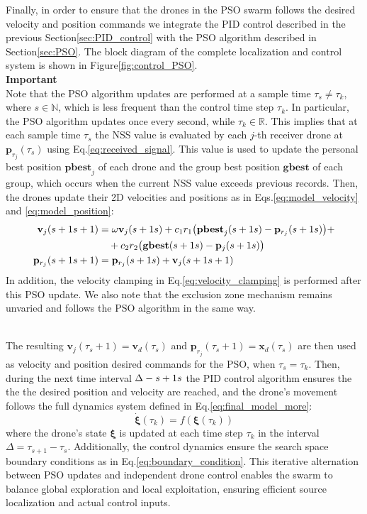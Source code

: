 Finally, in order to ensure that the drones in the PSO swarm follows
the desired velocity and position commands we integrate the 
PID control described in the previous Section\ref{sec:PID_control} 
with the PSO algorithm described in Section\ref{sec:PSO}.
The block diagram of the complete localization and control 
system is shown in Figure\ref{fig:control_PSO}.
\\

\noindent
\textbf{Important}
\\
Note that the PSO algorithm updates are performed at a sample time 
$\tau_s \neq \tau_k$, where $s \in \mathbb{N}$, which is less 
frequent than the control time step $\tau_k$.
In particular, the PSO algorithm updates once every second, while 
$\tau_k \in \mathbb{R}$.
This implies that at each sample time $\tau_s$ the NSS value is 
evaluated by each $j$-th receiver drone at $\mathbf{p}_{r_j}(\tau_s)$ using 
Eq.\ref{eq:received_signal}.
This value is used to update the personal best position $\mathbf{pbest}_{j}$
of each drone and the group best position $\mathbf{gbest}$ of each group,
which occurs when the current NSS value exceeds previous records. 
Then, the drones update their 2D velocities and positions
as in Eqs.\ref{eq:model_velocity} and \ref{eq:model_position}:
\begin{align}
    \mathbf{v}_{j}(\tau_s+1) &= \omega \mathbf{v}_{j}(\tau_s) 
    + c_1 r_1 \big(\mathbf{pbest}_{j}(\tau_s) - \mathbf{p}_{r_j}(\tau_s)\big) + \notag \\
    &\quad + c_2 r_2 \big(\mathbf{gbest}(\tau_s) - \mathbf{p}_{j}(\tau_s)\big) \label{eq:model_velocity2} \\
    \mathbf{p}_{r_j}(\tau_s + 1) &= \mathbf{p}_{r_j}(\tau_s) + \mathbf{v}_{j}(\tau_s+1) \label{eq:model_position2}
\end{align}
In addition, the velocity clamping in Eq.\ref{eq:velocity_clamping} is performed after
this PSO update.
We also note that the exclusion zone mechanism remains unvaried
and follows the PSO algorithm in the same way.

\noindent
\\
The resulting $\mathbf{v}_{j}(\tau_s+1) = \mathbf{v}_d(\tau_s)$ and $\mathbf{p}_{r_j}(\tau_s + 1) = \mathbf{x}_d(\tau_s)$
are then used as velocity and position desired commands for the PSO, when 
$\tau_s = \tau_k$.
Then, during the next time interval $\Delta \def \tau_{s+1} - \tau_s$ the PID
control algorithm ensures the the the desired position and velocity are reached,
and the drone's movement follows the full dynamics system defined in 
Eq.\ref{eq:final_model_more}:
\begin{equation}
    \dot{\mathbf{\xi}}(\tau_k) = f(\mathbf{\xi}(\tau_k))
\end{equation}
where the drone’s state $\mathbf{\xi}$ is updated at each time step $\tau_k$ in the 
interval $\Delta = \tau_{s+1} - \tau_s$.
Additionally, the control dynamics ensure the 
search space boundary conditions as in
Eq.\ref{eq:boundary_condition}.
This iterative alternation between PSO updates and 
independent drone 
control enables the swarm to balance global 
exploration and local exploitation, 
ensuring efficient source localization and actual 
control inputs.
